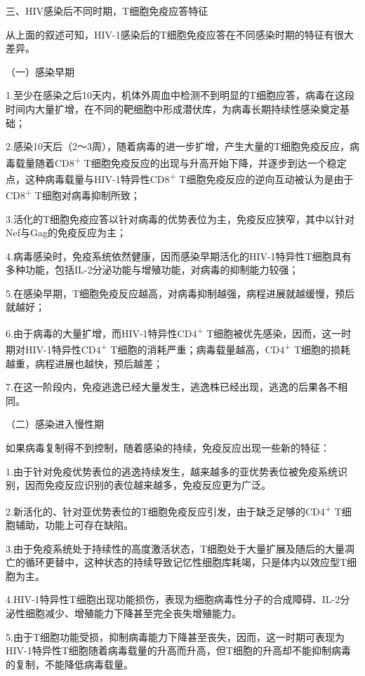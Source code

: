 \begin{center}
 {\large 三、HIV感染后不同时期，T细胞免疫应答特征}
 \end{center}

从上面的叙述可知，HIV-1感染后的T细胞免疫应答在不同感染时期的特征有很大差异。

（一）感染早期

1.至少在感染之后10天内，机体外周血中检测不到明显的T细胞应答，病毒在这段时间内大量扩增，在不同的靶细胞中形成潜伏库，为病毒长期持续性感染奠定基础；

2.感染10天后（2～3周），随着病毒的进一步扩增，产生大量的T细胞免疫反应，病毒载量随着CD8\textsuperscript{+}
T细胞免疫反应的出现与升高开始下降，并逐步到达一个稳定点，这种病毒载量与HIV-1特异性CD8\textsuperscript{+}
T细胞免疫反应的逆向互动被认为是由于CD8\textsuperscript{+}
T细胞对病毒抑制所致；

3.活化的T细胞免疫应答以针对病毒的优势表位为主，免疫反应狭窄，其中以针对Nef与Gag的免疫反应为主；

4.病毒感染时，免疫系统依然健康，因而感染早期活化的HIV-1特异性T细胞具有多种功能，包括IL-2分泌功能与增殖功能，对病毒的抑制能力较强；

5.在感染早期，T细胞免疫反应越高，对病毒抑制越强，病程进展就越缓慢，预后就越好；

6.由于病毒的大量扩增，而HIV-1特异性CD4\textsuperscript{+}
T细胞被优先感染，因而，这一时期对HIV-1特异性CD4\textsuperscript{+}
T细胞的消耗严重；病毒载量越高，CD4\textsuperscript{+}
T细胞的损耗越重，病程进展也越快，预后越差；

7.在这一阶段内，免疫逃逸已经大量发生，逃逸株已经出现，逃逸的后果各不相同。

（二）感染进入慢性期

如果病毒复制得不到控制，随着感染的持续，免疫反应出现一些新的特征：

1.由于针对免疫优势表位的逃逸持续发生，越来越多的亚优势表位被免疫系统识别，因而免疫反应识别的表位越来越多，免疫反应更为广泛。

2.新活化的、针对亚优势表位的T细胞免疫反应引发，由于缺乏足够的CD4\textsuperscript{+}
T细胞辅助，功能上可存在缺陷。

3.由于免疫系统处于持续性的高度激活状态，T细胞处于大量扩展及随后的大量凋亡的循环更替中，这种状态的持续导致记忆性细胞库耗竭，只是体内以效应型T细胞为主。

4.HIV-1特异性T细胞出现功能损伤，表现为细胞病毒性分子的合成障碍、IL-2分泌性细胞减少、增殖能力下降甚至完全丧失增殖能力。

5.由于T细胞功能受损，抑制病毒能力下降甚至丧失，因而，这一时期可表现为HIV-1特异性T细胞随着病毒载量的升高而升高，但T细胞的升高却不能抑制病毒的复制，不能降低病毒载量。

